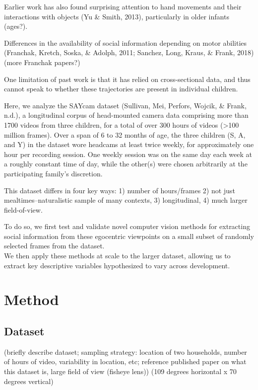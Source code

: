 \documentclass[10pt, letterpaper]{article}
\begin{document}
Earlier work has also found surprising attention to hand movements and
their interactions with objects (Yu \& Smith, 2013), particularly in
older infants (ages?).

Differences in the availability of social information depending on motor
abilities (Franchak, Kretch, Soska, \& Adolph, 2011; Sanchez, Long,
Kraus, \& Frank, 2018) (more Franchak papers?)

One limitation of past work is that it has relied on cross-sectional
data, and thus cannot speak to whether these trajectories are present in
individual children.

Here, we analyze the SAYcam dataset (Sullivan, Mei, Perfors, Wojcik, \&
Frank, n.d.), a longitudinal corpus of head-mounted camera data
comprising more than 1700 videos from three children, for a total of
over 300 hours of videos (\textgreater{}100 million frames). Over a span
of 6 to 32 months of age, the three children (S, A, and Y) in the
dataset wore headcams at least twice weekly, for approximately one hour
per recording session. One weekly session was on the same day each week
at a roughly constant time of day, while the other(s) were chosen
arbitrarily at the participating family's discretion.

This dataset differs in four key ways: 1) number of hours/frames 2) not
just mealtimes--naturalistic sample of many contexts, 3) longitudinal,
4) much larger field-of-view.

To do so, we first test and validate novel computer vision methods for
extracting social information from these egocentric viewpoints on a
small subset of randomly selected frames from the dataset.\\
We then apply these methods at scale to the larger dataset, allowing us
to extract key descriptive variables hypothesized to vary across
development.

\hypertarget{method}{%
\section{Method}\label{method}}

\hypertarget{dataset}{%
\subsection{Dataset}\label{dataset}}

(briefly describe dataset; sampling strategy: location of two
households, number of hours of video, variability in location, etc;
reference published paper on what this dataset is, large field of view
(fisheye lens)) (109 degrees horizontal x 70 degrees vertical)
\end{document}
